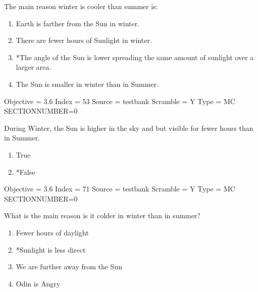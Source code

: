 \documentclass[11pt]{article}
\begin{document}
\begin{enumerate}
\begin{minipage}{\textwidth}
\begin{minipage}{\textwidth}
\item The main reason winter is cooler than summer is:
\begin{enumerate} 
\setlength{\itemsep}{1pt} 
\setlength{\parskip}{0pt} 
\setlength{\parsep}{0pt}
\setlength{\multicolsep}{1pt} 
\item Earth is farther from the Sun in winter.
\item There are fewer hours of Sunlight in winter.
\item *The angle of the Sun is lower spreading the same amount of sunlight over a larger area.
\item The Sun is smaller in winter than in Summer.
\end{enumerate} 
Objective = 3.6
Index = 53
Source = testbank
Scramble = Y
Type = MC
SECTIONNUMBER=0
\end{minipage}
\end{minipage}
\vskip 0.20in

\begin{minipage}{\textwidth}
\begin{minipage}{\textwidth}
\item During Winter, the Sun is higher in the sky and but visible for fewer hours than in Summer.
\begin{multicols}{3}
\begin{enumerate} 
\setlength{\itemsep}{1pt} 
\setlength{\parskip}{0pt} 
\setlength{\parsep}{0pt}
\setlength{\multicolsep}{1pt} 
\item True
\item *False
\end{enumerate} 
\vfill 
\end{multicols}

Objective = 3.6
Index = 71
Source = testbank
Scramble = Y
Type = MC
SECTIONNUMBER=0
\end{minipage}
\end{minipage}
\vskip 0.20in

\begin{minipage}{\textwidth}
\begin{minipage}{\textwidth}
\item What is the main reason is it colder in winter than in summer?
\begin{multicols}{2}
\begin{enumerate} 
\setlength{\itemsep}{1pt} 
\setlength{\parskip}{0pt} 
\setlength{\parsep}{0pt}
\setlength{\multicolsep}{1pt} 
\item Fewer hours of daylight
\item *Sunlight is less direct
\item We are further away from the Sun
\item Odin is Angry
\end{enumerate} 
\vfill 
\end{multicols}


\end{minipage}
\end{minipage}
\end{enumerate}
\end{document}
